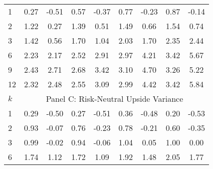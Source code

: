 \documentclass[11pt]{article}
\begin{document}
\begin{table}
\begin{center}
\begin{tabular}{lllllllll}
\hline
1 & \multicolumn{1}{c}{0.27} & \multicolumn{1}{c}{-0.51} & \multicolumn{1}{c}{0.57} & \multicolumn{1}{c}{-0.37} & \multicolumn{1}{c}{0.77} & \multicolumn{1}{c}{-0.23} & \multicolumn{1}{c}{0.87} & \multicolumn{1}{c}{-0.14} \\
2 & \multicolumn{1}{c}{1.22} & \multicolumn{1}{c}{0.27} & \multicolumn{1}{c}{1.39} & \multicolumn{1}{c}{0.51} & \multicolumn{1}{c}{1.49} & \multicolumn{1}{c}{0.66} & \multicolumn{1}{c}{1.54} & \multicolumn{1}{c}{0.74} \\
3 & \multicolumn{1}{c}{1.42} & \multicolumn{1}{c}{0.56} & \multicolumn{1}{c}{1.70} & \multicolumn{1}{c}{1.04} & \multicolumn{1}{c}{2.03} & \multicolumn{1}{c}{1.70} & \multicolumn{1}{c}{2.35} & \multicolumn{1}{c}{2.44} \\
6 & \multicolumn{1}{c}{2.23} & \multicolumn{1}{c}{2.17} & \multicolumn{1}{c}{2.52} & \multicolumn{1}{c}{2.91} & \multicolumn{1}{c}{2.97} & \multicolumn{1}{c}{4.21} & \multicolumn{1}{c}{3.42} & \multicolumn{1}{c}{5.67} \\
9 & \multicolumn{1}{c}{2.43} & \multicolumn{1}{c}{2.71} & \multicolumn{1}{c}{2.68} & \multicolumn{1}{c}{3.42} & \multicolumn{1}{c}{3.10} & \multicolumn{1}{c}{4.70} & \multicolumn{1}{c}{3.26} & \multicolumn{1}{c}{5.22} \\
12 & \multicolumn{1}{c}{2.32} & \multicolumn{1}{c}{2.48} & \multicolumn{1}{c}{2.55} & \multicolumn{1}{c}{3.09} & \multicolumn{1}{c}{2.99} & \multicolumn{1}{c}{4.42} & \multicolumn{1}{c}{3.42} & \multicolumn{1}{c}{5.84} \\
\hline
$k$ & \multicolumn{8}{c}{Panel C: Risk-Neutral Upside Variance} \\
\hline
1 & \multicolumn{1}{c}{0.29} & \multicolumn{1}{c}{-0.50} & \multicolumn{1}{c}{0.27} & \multicolumn{1}{c}{-0.51} & \multicolumn{1}{c}{0.36} & \multicolumn{1}{c}{-0.48} & \multicolumn{1}{c}{0.20} & \multicolumn{1}{c}{-0.53} \\
2 & \multicolumn{1}{c}{0.93} & \multicolumn{1}{c}{-0.07} & \multicolumn{1}{c}{0.76} & \multicolumn{1}{c}{-0.23} & \multicolumn{1}{c}{0.78} & \multicolumn{1}{c}{-0.21} & \multicolumn{1}{c}{0.60} & \multicolumn{1}{c}{-0.35} \\
3 & \multicolumn{1}{c}{0.99} & \multicolumn{1}{c}{-0.02} & \multicolumn{1}{c}{0.94} & \multicolumn{1}{c}{-0.06} & \multicolumn{1}{c}{1.04} & \multicolumn{1}{c}{0.05} & \multicolumn{1}{c}{1.00} & \multicolumn{1}{c}{0.00} \\
6 & \multicolumn{1}{c}{1.74} & \multicolumn{1}{c}{1.12} & \multicolumn{1}{c}{1.72} & \multicolumn{1}{c}{1.09} & \multicolumn{1}{c}{1.92} & \multicolumn{1}{c}{1.48} & \multicolumn{1}{c}{2.05} & \multicolumn{1}{c}{1.77} \\

\end{tabular}
\end{center}
\end{table}
\end{document}
